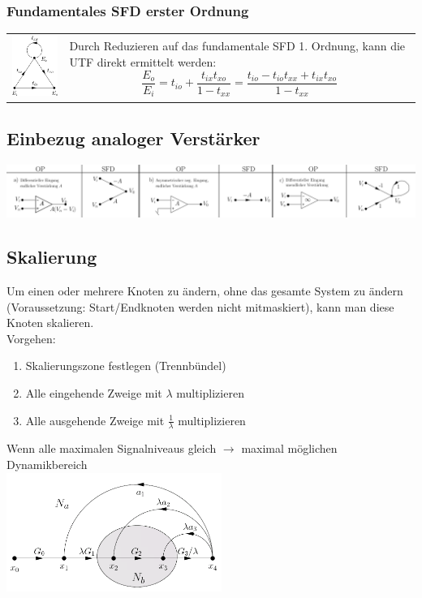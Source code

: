 \subsubsection{Fundamentales SFD erster Ordnung }
\begin{tabular}{ll}
	\parbox{7cm}{
    	\includegraphics[width=3cm]{./images/sfd-fundamental-erster-ordnung.png}
    }
    & \parbox{12cm}{
		Durch Reduzieren auf das fundamentale SFD 1. Ordnung, kann die UTF direkt
		ermittelt werden: \\
		$$\frac{E_o}{E_i}=
		t_{io}+\frac{t_{ix}t_{xo}}{1-t_{xx}}=
		\frac{t_{io}-t_{io}t_{xx}+t_{ix}t_{xo}}{1-t_{xx}}$$
	}
\end{tabular}

\subsection{Einbezug analoger Verstärker }
\includegraphics[width=18cm]{./images/sfd-op.png}

\subsection{Skalierung}
	Um einen oder mehrere Knoten zu ändern, ohne das gesamte System zu
	ändern (Voraussetzung: Start/Endknoten werden nicht mitmaskiert), kann man
	diese Knoten skalieren.\\
	Vorgehen: 
	\begin{enumerate}
                \item Skalierungszone festlegen (Trennbündel)
                \item Alle eingehende Zweige mit $\lambda$ multiplizieren
                \item Alle ausgehende Zweige mit $\frac{1}{\lambda}$
                multiplizieren
    \end{enumerate}
    Wenn alle maximalen Signalniveaus gleich $\rightarrow$ maximal möglichen
    Dynamikbereich\\
    \includegraphics[width=7cm]{./images/sfd-scalierung.png}
    

